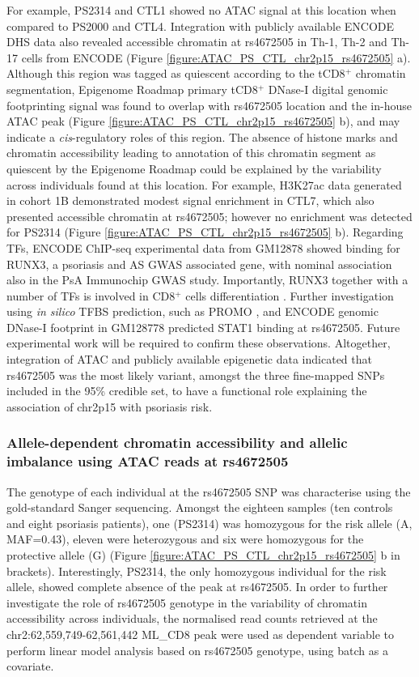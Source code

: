 For example, PS2314 and CTL1 showed no ATAC signal at this location when compared to PS2000 and CTL4. Integration with publicly available ENCODE DHS data also revealed accessible chromatin at rs4672505 in Th-1, Th-2 and Th-17 cells from ENCODE (Figure \ref{figure:ATAC_PS_CTL_chr2p15_rs4672505} a). Although this region was tagged as quiescent according to the tCD8$^+$ chromatin segmentation, Epigenome Roadmap primary tCD8$^+$ DNase-I digital genomic footprinting signal was found to overlap with rs4672505 location and the in-house ATAC peak (Figure \ref{figure:ATAC_PS_CTL_chr2p15_rs4672505} b), and may indicate a \textit{cis}-regulatory roles of this region. The absence of histone marks and chromatin accessibility leading to annotation of this chromatin segment as quiescent by the Epigenome Roadmap could be explained by the variability across individuals found at this location. For example, H3K27ac data generated in cohort 1B demonstrated modest signal enrichment in CTL7, which also presented accessible chromatin at rs4672505; however no enrichment was detected for PS2314 (Figure \ref{figure:ATAC_PS_CTL_chr2p15_rs4672505} b). Regarding TFs, ENCODE ChIP-seq experimental data from GM12878 showed binding for RUNX3, a psoriasis and AS GWAS associated gene, with nominal association also in the PsA Immunochip GWAS study. Importantly, RUNX3 together with a number of TFs is involved in CD8$^+$ cells differentiation \parencite{Wong2011}. Further investigation using \textit{in silico} TFBS prediction, such as PROMO \parencite{Messeguer2002}, and ENCODE genomic DNase-I footprint in GM128778 predicted STAT1 binding at rs4672505. Future experimental work will be required to confirm these observations. Altogether, integration of ATAC and publicly available epigenetic data indicated that rs4672505 was the most likely variant, amongst the three fine-mapped SNPs included in the 95\% credible set, to have a functional role explaining the association of chr2p15 with psoriasis risk.


\subsubsection{Allele-dependent chromatin accessibility and allelic imbalance using ATAC reads at rs4672505}
The genotype of each individual at the rs4672505 SNP was characterise using the gold-standard Sanger sequencing. Amongst the eighteen samples (ten controls and eight psoriasis patients), one (PS2314) was homozygous for the risk allele (A, MAF=0.43), eleven were heterozygous and six were homozygous for the protective allele (G) (Figure \ref{figure:ATAC_PS_CTL_chr2p15_rs4672505} b in brackets). Interestingly, PS2314, the only homozygous individual for the risk allele, showed complete absence of the peak at rs4672505. In order to further investigate the role of rs4672505 genotype in the variability of chromatin accessibility across individuals, the normalised read counts retrieved at the chr2:62,559,749-62,561,442 ML\_CD8 peak were used as dependent variable to perform linear model analysis based on rs4672505 genotype, using batch as a covariate. 



